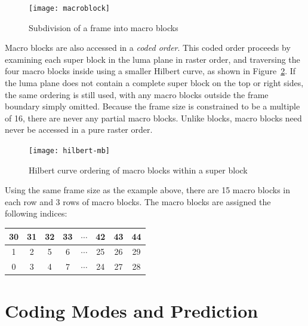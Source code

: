 \documentclass[9pt,letterpaper]{book}
\newcommand{\term}[1]{{\em #1}}
\numberwithin{equation}{chapter}
\numberwithin{figure}{chapter}
\numberwithin{table}{chapter}
\begin{document}
\begin{figure}[htbp]
 \begin{center}
 \texttt{[image: macroblock]}
 \end{center}
 \caption{Subdivision of a frame into macro blocks}
 \label{fig:macroblock}
\end{figure}

Macro blocks are also accessed in a \term{coded order}.
This coded order proceeds by examining each super block in the luma plane in
 raster order, and traversing the four macro blocks inside using a smaller
 Hilbert curve, as shown in Figure~\ref{fig:hilbert-mb}.
If the luma plane does not contain a complete super block on the top or right
 sides, the same ordering is still used, with any macro blocks outside
 the frame boundary simply omitted.
Because the frame size is constrained to be a multiple of 16, there are never
 any partial macro blocks.
Unlike blocks, macro blocks need never be accessed in a pure raster order.

\begin{figure}[htbp]
\begin{center}
\texttt{[image: hilbert-mb]}
\end{center}
\caption{Hilbert curve ordering of macro blocks within a super block}
\label{fig:hilbert-mb}
\end{figure}

Using the same frame size as the example above, there are 15 macro blocks in
 each row and 3 rows of macro blocks.
The macro blocks are assigned the following indices:

\vspace{\baselineskip}
\begin{center}
\begin{tabular}{|cc|cc|c|cc|c|}\hline
30 & 31 & 32 & 33 & $\cdots$ & 42 & 43 & 44 \\\hline
 1 &  2 &  5 &  6 & $\cdots$ & 25 & 26 & 29 \\
 0 &  3 &  4 &  7 & $\cdots$ & 24 & 27 & 28 \\\hline
\end{tabular}
\end{center}
\vspace{\baselineskip}

\section{Coding Modes and Prediction}
\end{document}
